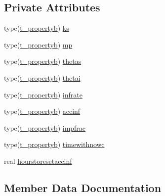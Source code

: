 \subsection*{Private Attributes}
\begin{DoxyCompactItemize}
\item 
type(\mbox{\hyperlink{structmodulebasin_1_1t__propertyb}{t\+\_\+propertyb}}) \mbox{\hyperlink{structmodulebasin_1_1t__simpleinfiltration_a1e9ba66d88b93e0b97e48fadace97291}{ks}}
\item 
type(\mbox{\hyperlink{structmodulebasin_1_1t__propertyb}{t\+\_\+propertyb}}) \mbox{\hyperlink{structmodulebasin_1_1t__simpleinfiltration_aa57630619aab9ea795c6ea5bde8ac567}{mp}}
\item 
type(\mbox{\hyperlink{structmodulebasin_1_1t__propertyb}{t\+\_\+propertyb}}) \mbox{\hyperlink{structmodulebasin_1_1t__simpleinfiltration_a250b1e4965f986ee9aaed83fbd8788cb}{thetas}}
\item 
type(\mbox{\hyperlink{structmodulebasin_1_1t__propertyb}{t\+\_\+propertyb}}) \mbox{\hyperlink{structmodulebasin_1_1t__simpleinfiltration_a5f3049d28ca746d9b615c82194e5eef4}{thetai}}
\item 
type(\mbox{\hyperlink{structmodulebasin_1_1t__propertyb}{t\+\_\+propertyb}}) \mbox{\hyperlink{structmodulebasin_1_1t__simpleinfiltration_a3c28b9a3c46e80b083a5bc54b41bc14a}{infrate}}
\item 
type(\mbox{\hyperlink{structmodulebasin_1_1t__propertyb}{t\+\_\+propertyb}}) \mbox{\hyperlink{structmodulebasin_1_1t__simpleinfiltration_a0ff6da8a075c699bae9f43c0a3ce7e90}{accinf}}
\item 
type(\mbox{\hyperlink{structmodulebasin_1_1t__propertyb}{t\+\_\+propertyb}}) \mbox{\hyperlink{structmodulebasin_1_1t__simpleinfiltration_ab190286a42bacd6c51001b3dd5d9c4ed}{impfrac}}
\item 
type(\mbox{\hyperlink{structmodulebasin_1_1t__propertyb}{t\+\_\+propertyb}}) \mbox{\hyperlink{structmodulebasin_1_1t__simpleinfiltration_ad85cc3fd9bcb94f8fab6248187b710ee}{timewithnowc}}
\item 
real \mbox{\hyperlink{structmodulebasin_1_1t__simpleinfiltration_a98615b08e43838cb722e7cee31f5bb21}{hourstoresetaccinf}}
\end{DoxyCompactItemize}


\subsection{Member Data Documentation}
\mbox{\label{structmodulebasin_1_1t__simpleinfiltration_a0ff6da8a075c699bae9f43c0a3ce7e90}} 
